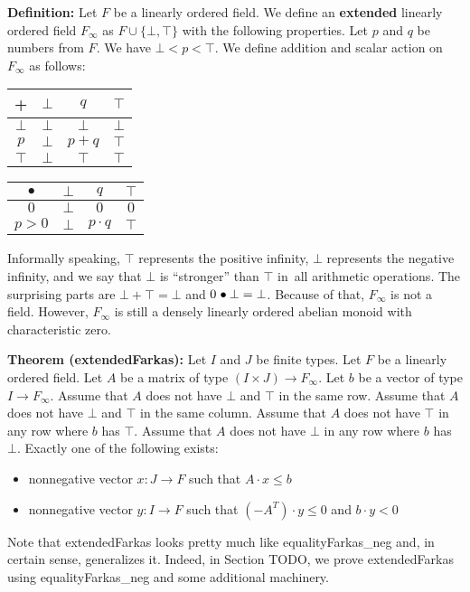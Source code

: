 \documentclass[]{article}
\renewcommand{\.}{\hskip .75pt}
\let\r=\rightarrow
\let\*=\cdot
\begin{document}
\medskip \noindent
\textbf{Definition:}
Let $F$ be a linearly ordered field.
We define an \textbf{extended} linearly ordered field $F_\infty$ as
$F \cup \{ \bot, \top \}$ with the following properties.
Let $p$ and $q$ be numbers from $F$.
We have $\bot < p < \top$.
We define addition and scalar action on $F_\infty$ as follows:
\begin{center}
	\begin{tabular}{ c || c | c | c | }
		+ & $\bot$ & $q$ & $\top$  \\
		\hline\hline
		$\bot$ & $\bot$ & $\bot$ & $\bot$  \\ 
		\hline
		$p$ & $\bot$ & $p\!+\!q$ & $\top$  \\ 
		\hline
		$\top$ & $\bot$ & $\top$ & $\top$ \\ 
		\hline
	\end{tabular}
	\qquad\qquad\qquad
	\begin{tabular}{ c || c | c | c | }
		$\bullet$ & $\bot$ & $q$ & $\top$  \\
		\hline\hline
		$0$ & $\bot$ & $0$ & $0$  \\ 
		\hline
		$p>0$ & $\bot$ & $p \cdot q$ & $\top$  \\ 
		\hline
	\end{tabular}
\end{center}
Informally speaking, $\top$ represents the positive infinity,
$\bot$ represents the negative infinity, and we say that
$\bot$ is ``stronger'' than $\top$ in~all arithmetic operations.
The surprising parts are $\bot + \top = \bot$ and $0 \.\bullet \bot = \bot$.
Because of that, $F_\infty$ is not a field.
However, $F_\infty$ is still a densely linearly ordered abelian monoid
with characteristic zero.

\medskip \noindent
\textbf{Theorem (extendedFarkas):}
Let $I$ and $J$ be finite types.
Let $F$ be a linearly ordered field.
Let $A$ be a matrix of type $(I \times J) \r F_\infty$.
Let $b$ be a vector of type $I \r F_\infty$.
Assume that $A$ does not have $\bot$ and $\top$ in the same row.
Assume that $A$ does not have $\bot$ and $\top$ in the same column.
Assume that $A$ does not have $\top$ in any row where $b$ has $\top$.
Assume that $A$ does not have $\bot$ in any row where $b$ has~$\bot$.
Exactly one of the following exists:
\begin{itemize}
\item nonnegative vector $x : J \r F$ such that $A \* x \le b$
\item nonnegative vector $y : I \r F$ such that $(-A^T) \* y \le 0$ and $b \* y < 0$
\end{itemize}
Note that extendedFarkas looks pretty much like equalityFarkas\_neg and,
in certain sense, generalizes it. Indeed, in Section TODO, we prove
extendedFarkas using equalityFarkas\_neg and some additional machinery.
\end{document}
